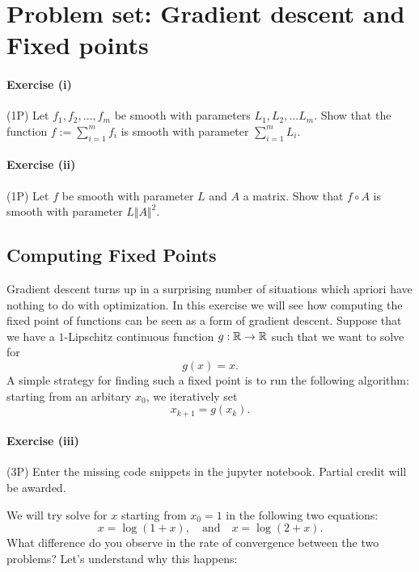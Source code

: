 \documentclass{scrartcl}
\theoremstyle{definition}
\begin{document}
\section*{Problem set: Gradient descent and Fixed points}%



\paragraph{Exercise (i)} (1P)  Let $f_1, f_2, \dots, f_m$ be smooth with parameters $L_1, L_2, \dots L_m$. Show that the function $f:= \sum_{i=1}^{m}f_i$ is smooth with parameter $\sum_{i=1}^{m}L_i$.

\paragraph{Exercise (ii)} (1P)  Let $f$ be smooth with parameter $L$ and $A$ a matrix. Show that $f\circ A$ is smooth with parameter $L \Vert A \Vert^2$.




\subsection*{Computing Fixed Points}%

Gradient descent turns up in a surprising number of situations which apriori have nothing to do with optimization.
In this exercise we will see how computing the fixed point of functions can be seen as a form of gradient descent.
Suppose that we have a $1$-Lipschitz continuous function $g : \mathbb{R} \to \mathbb{R}$ such that we want to solve for
\begin{equation}
  g(x) = x .
\end{equation}
A simple strategy for finding such a fixed point is to run the following algorithm: starting from an arbitary $x_0$,
we iteratively set
\begin{equation}
  \label{fpi}
  x_{k+1} = g(x_k) .
\end{equation}

\paragraph{Exercise (iii)} (3P) Enter the missing code snippets in the jupyter notebook. Partial credit will be awarded.

We will try solve for $x$ starting from $x_0 = 1$ in the following two equations:
\begin{equation}
  \label{log}
  x = \log(1 + x), \quad \text{and} \quad x = \log(2 + x).
\end{equation}
What difference do you observe in the rate of convergence between the two problems? Let’s understand why this happens:
\end{document}
